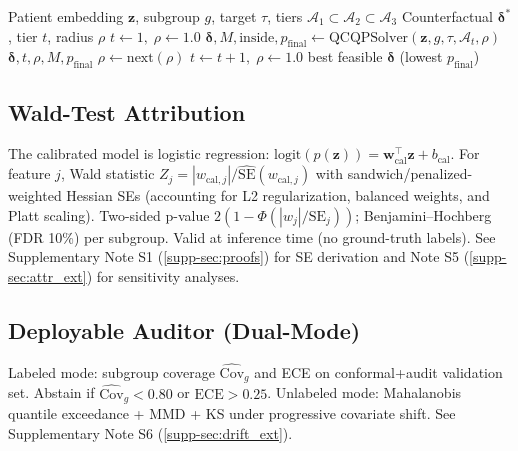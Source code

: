 \documentclass[11pt,a4paper]{article}
\theoremstyle{plain}
\begin{document}
\begin{algorithm}[htbp]
\caption{Loop 1 -- Tiered QCQP Counterfactual Recovery}
\label{alg:recovery}
\begin{algorithmic}[1]
\Require Patient embedding $\mathbf z$, subgroup $g$, target $\tau$, tiers $\mathcal A_1\subset\mathcal A_2\subset\mathcal A_3$
\Ensure Counterfactual $\boldsymbol\delta^*$, tier $t$, radius $\rho$
\State $t \gets 1,\; \rho \gets 1.0$
    \State $\boldsymbol\delta, M, \text{inside}, p_{\text{final}} \gets \text{QCQPSolver}(\mathbf z, g, \tau, \mathcal A_t, \rho)$
      \State \Return $\boldsymbol\delta, t, \rho, M, p_{\text{final}}$
    \EndIf
    \State $\rho \gets \text{next}(\rho)$ 
  \EndWhile
  \State $t \gets t+1,\; \rho \gets 1.0$ 
\EndWhile
\State \Return best feasible $\boldsymbol\delta$ (lowest $p_{\text{final}}$)
\end{algorithmic}
\end{algorithm}

\subsection{Wald-Test Attribution}
\label{sec:attribution}

The calibrated model is logistic regression: $\text{logit}(p(\mathbf z)) = \mathbf w_{\text{cal}}^\top\mathbf z + b_{\text{cal}}$. For feature $j$, Wald statistic $Z_j = |w_{\text{cal},j}|/\widehat{\mathrm{SE}}(w_{\text{cal},j})$ with sandwich/penalized-weighted Hessian SEs (accounting for L2 regularization, balanced weights, and Platt scaling). Two-sided p-value $2(1-\Phi(|w_j|/\mathrm{SE}_j))$; Benjamini--Hochberg (FDR 10\%) per subgroup. Valid at inference time (no ground-truth labels). See Supplementary Note S1 (\ref{supp-sec:proofs}) for SE derivation and Note S5 (\ref{supp-sec:attr_ext}) for sensitivity analyses.

\subsection{Deployable Auditor (Dual-Mode)}
\label{sec:auditor}

Labeled mode: subgroup coverage $\widehat{\mathrm{Cov}}_g$ and ECE on conformal+audit validation set. Abstain if $\widehat{\mathrm{Cov}}_g < 0.80$ or $\mathrm{ECE} > 0.25$. Unlabeled mode: Mahalanobis quantile exceedance + MMD + KS under progressive covariate shift. See Supplementary Note S6 (\ref{supp-sec:drift_ext}).
\end{document}
